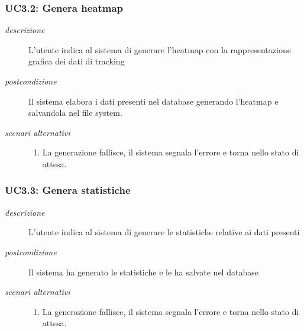 \subsubsection{UC3.2: Genera heatmap} \label{sec:UC3.2}
\begin{description}
\item[\em{descrizione }]L'utente indica al sistema di generare l'heatmap con la rappresentazione grafica dei dati di tracking
\item[\em{postcondizione }] Il sistema elabora i dati presenti nel database generando l'heatmap e salvandola nel file system.
\item[\em{scenari alternativi }] \mbox{}

  \begin{enumerate}
\item La generazione fallisce, il sistema segnala l'errore e torna nello stato di attesa.
\end{enumerate}
\end{description}

\subsubsection{UC3.3: Genera statistiche} \label{sec:UC3.3}
\begin{description}
\item[\em{descrizione }]L'utente indica al sistema di generare le statistiche relative ai dati presenti
\item[\em{postcondizione }] Il sistema ha generato le statistiche e le ha salvate nel database
\item[\em{scenari alternativi }] \mbox{}

  \begin{enumerate}
\item La generazione fallisce, il sistema segnala l'errore e torna nello stato di attesa.
\end{enumerate}
\end{description}

